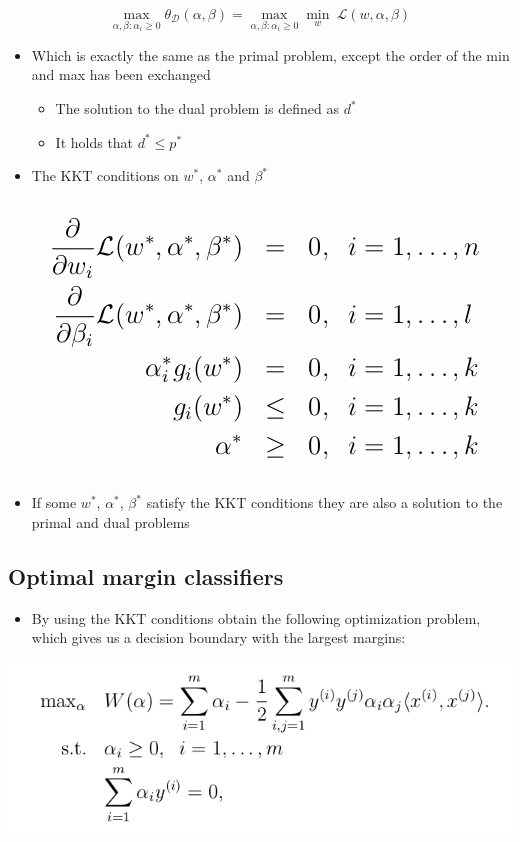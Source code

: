 \documentclass[11pt]{article}
\begin{document}
\begin{equation}
  \max_{\alpha,\beta: \alpha_i  \geq 0} \theta_\mathcal D (\alpha, \beta) = \max_{\alpha,\beta: \alpha_i  \geq 0} \min_w \ \mathcal L (w,\alpha,\beta)
\end{equation}
\begin{itemize}
\item Which is exactly the same as the primal problem, except the order of the min and max has been exchanged
\begin{itemize}
\item The solution to the dual problem is defined as \(d^*\)
\item It holds that \(d^* \leq p^*\)
\end{itemize}

\item The KKT conditions on \(w^*\), \(\alpha^*\) and \(\beta^*\)
\end{itemize}
\begin{center}
\includegraphics[width=.9\linewidth]{Support Vector Machines/screenshot_2018-09-24_17-52-15.png}
\end{center}

\begin{itemize}
\item If some \(w^*\), \(\alpha^*\), \(\beta^*\) satisfy the KKT conditions they are also a solution to the primal and dual problems
\end{itemize}

\subsection{Optimal margin classifiers}
\label{sec:org85ddfc0}
\begin{itemize}
\item By using the KKT conditions obtain the following optimization problem, which gives us a decision boundary with the largest margins:
\end{itemize}
\begin{center}
\includegraphics[width=.9\linewidth]{Support Vector Machines/screenshot_2018-09-25_07-46-53.png}
\end{center}
\end{document}
